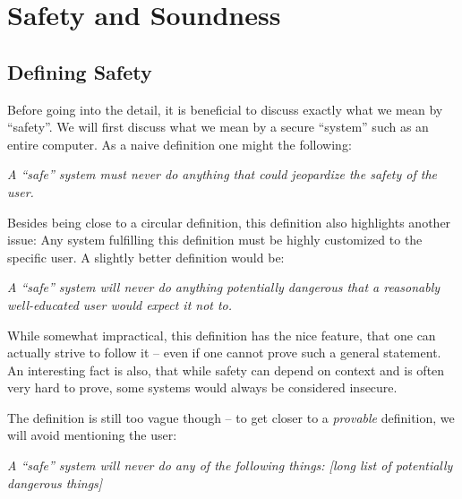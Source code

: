\chapter{Safety and Soundness}
\label{chap:safesound}


\section{Defining Safety}

Before going into the detail, it is beneficial to discuss exactly what we mean
by ``safety''. We will first discuss what we mean by a secure ``system'' such as
an entire computer. As a naive definition one might the following:

\vspace{0.3cm}
\begin{addmargin}{1cm}
  {\it A ``safe'' system must never do anything that could jeopardize the
    safety of the user.}
\end{addmargin}
\vspace{0.3cm}

Besides being close to a circular definition, this definition also highlights
another issue: Any system fulfilling this definition must be highly customized
to the specific user. A slightly better definition would be:

\vspace{0.3cm}
\begin{addmargin}{1cm}
  {\it A ``safe'' system will never do anything potentially dangerous that a
    reasonably well-educated user would expect it not to.}
\end{addmargin}
\vspace{0.3cm}

While somewhat impractical, this definition has the nice feature, that one can
actually strive to follow it -- even if one cannot prove such a general
statement. An interesting fact is also, that while safety can depend on context
and is often very hard to prove, some systems would always be considered
insecure.

The definition is still too vague though -- to get closer to a \emph{provable}
definition, we will avoid mentioning the user:

\vspace{0.3cm}
\begin{addmargin}{1cm}
  {\it A ``safe'' system will never do any of the following things: [long list
    of potentially dangerous things]}
\end{addmargin}
\vspace{0.3cm}

